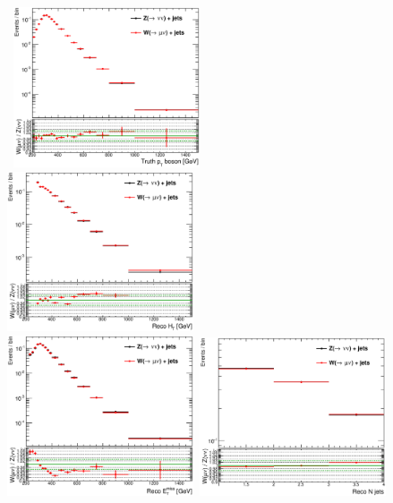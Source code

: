 \begin{figure}
\begin{center}
\mbox{
  \includegraphics[width=0.49\textwidth]{Appendix_ClosureTestZnunu/Figures/compareNormalized_bosonVec_truth_pt_A6_Nom_CRcutsWZFiducialMu.eps}
  \includegraphics[width=0.49\textwidth]{Appendix_ClosureTestZnunu/Figures/compareNormalized_HT_A6_Nom_CRcutsWZFiducialMu.eps}
}                                                                          
\mbox{                                                                     
  \includegraphics[width=0.49\textwidth]{Appendix_ClosureTestZnunu/Figures/compareNormalized_met_A6_Nom_CRcutsWZFiducialMu.eps}
  \includegraphics[width=0.49\textwidth]{Appendix_ClosureTestZnunu/Figures/compareNormalized_n_jets_A6_Nom_CRcutsWZFiducialMu.eps}
}
\end{center}
\end{figure}

